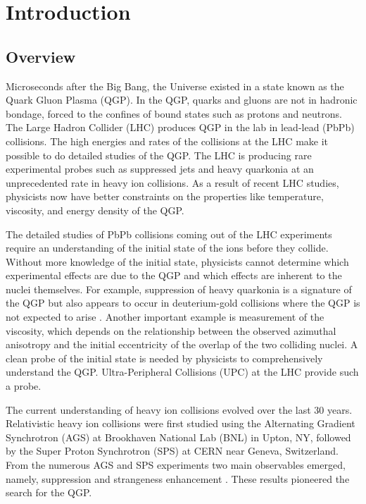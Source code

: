 \chapter{Introduction}
  \section{Overview}
  Microseconds after the Big Bang, the Universe existed in a state known as
    the Quark Gluon Plasma (QGP).
  In the QGP, quarks and gluons are not in hadronic bondage, forced to 
    the confines of bound states such as protons and neutrons.
  The Large Hadron Collider (LHC) produces QGP in the lab in lead-lead (PbPb)
    collisions.
  The high energies and rates of the collisions at the LHC make it possible 
    to do detailed studies of the QGP. 
  The LHC is producing rare experimental probes such as suppressed jets and 
    heavy quarkonia at an unprecedented rate in heavy ion collisions. 
  As a result of recent LHC studies, physicists now have better constraints on 
    the properties like temperature, viscosity, and energy density of the QGP.

  The detailed studies of PbPb collisions coming out of the LHC 
    experiments require an understanding of the initial state of the ions 
    before they collide.
  Without more knowledge of the initial state, physicists cannot determine 
    which experimental effects are due to the QGP and which effects are 
    inherent to the nuclei themselves. 
  For example, suppression of heavy quarkonia is a signature of the QGP 
    but also appears to occur in deuterium-gold collisions where the QGP is not
    expected to arise \cite{dAuOniaPHENIX}. 
  Another important example is measurement of the viscosity, which depends on 
    the relationship between the observed azimuthal anisotropy and the 
    initial eccentricity of the overlap of the two colliding nuclei. 
  A clean probe of the initial state is needed by physicists to comprehensively 
    understand the QGP.
  Ultra-Peripheral Collisions (UPC) at the LHC provide such a probe.

  The current understanding of heavy ion collisions evolved over the
    last 30 years.
  Relativistic heavy ion collisions were first studied using the 
    Alternating Gradient Synchrotron (AGS) at Brookhaven National Lab (BNL) 
    in Upton, NY, followed by the Super Proton Synchrotron (SPS) at CERN near 
    Geneva, Switzerland. 
  From the numerous AGS and SPS experiments two main observables emerged,
    namely, \JPsi{} suppression and strangeness enhancement \cite{sps}. 
  These results pioneered the search for the QGP. 

